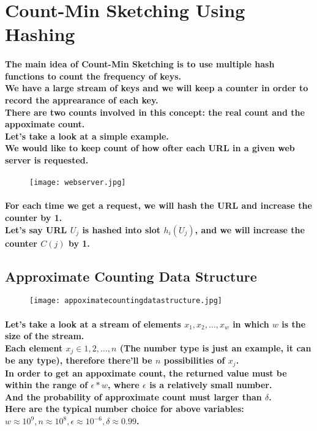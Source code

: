 \section{Count-Min Sketching Using Hashing}

\paragraph{The main idea of Count-Min Sketching is to use multiple hash functions to count the frequency of keys.\\
We have a large stream of keys and we will keep a counter in order to record the apprearance of each key.\\
There are two counts involved in this concept: the real count and the appoximate count.\\
Let's take a look at a simple example.\\
We would like to keep count of how ofter each URL in a given web server is requested.\\}

\begin{figure}[H]
    \texttt{[image: webserver.jpg]}
\end{figure}

\paragraph{
    For each time we get a request, we will hash the URL and increase the counter by 1.\\
    Let's say URL $U_j$ is hashed into slot $h_i(U_j)$, and we will increase the counter $C(j)$ by 1.\\
}

\subsection{Approximate Counting Data Structure}

\begin{figure}[H]
    \texttt{[image: appoximatecountingdatastructure.jpg]}
\end{figure}

\paragraph{
    Let's take a look at a stream of elements ${x_1, x_2, \ldots ,x_w}$ in which $w$ is the size of the stream.\\
    Each element $x_j \in {1,2,\ldots,n}$ (The number type is just an example, it can be any type), 
    therefore there'll be $n$ possibilities of $x_j$.\\
    In order to get an appoximate count, the returned value must be within the range of $\epsilon*w$, where $\epsilon$
    is a relatively small number.\\
    And the probability of approximate count must larger than $\delta$.\\
    Here are the typical number choice for above variables:\\
    $w \approx 10^9,n \approx 10^8, \epsilon \approx 10^{-6}, \delta \approx 0.99$.\\
}

